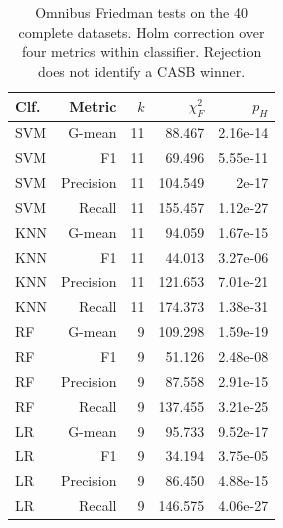 \begin{table}[pos=!htbp]
\centering\small
\caption{Omnibus Friedman tests on the 40 complete datasets. Holm correction over four metrics within classifier. Rejection does not identify a CASB winner.}\label{tab:friedman}
\begin{tabular}{lrrrr}\toprule
Clf. & Metric & $k$ & $\chi_F^2$ & $p_H$ \\
\midrule
SVM & G-mean & 11 & 88.467 & 2.16e-14 \\
SVM & F1 & 11 & 69.496 & 5.55e-11 \\
SVM & Precision & 11 & 104.549 & 2e-17 \\
SVM & Recall & 11 & 155.457 & 1.12e-27 \\
KNN & G-mean & 11 & 94.059 & 1.67e-15 \\
KNN & F1 & 11 & 44.013 & 3.27e-06 \\
KNN & Precision & 11 & 121.653 & 7.01e-21 \\
KNN & Recall & 11 & 174.373 & 1.38e-31 \\
RF & G-mean & 9 & 109.298 & 1.59e-19 \\
RF & F1 & 9 & 51.126 & 2.48e-08 \\
RF & Precision & 9 & 87.558 & 2.91e-15 \\
RF & Recall & 9 & 137.455 & 3.21e-25 \\
LR & G-mean & 9 & 95.733 & 9.52e-17 \\
LR & F1 & 9 & 34.194 & 3.75e-05 \\
LR & Precision & 9 & 86.450 & 4.88e-15 \\
LR & Recall & 9 & 146.575 & 4.06e-27 \\
\bottomrule\end{tabular}
\end{table}
